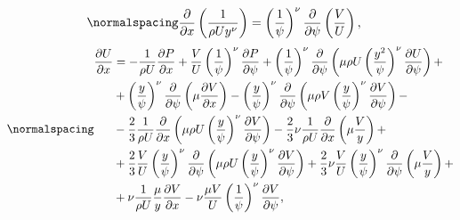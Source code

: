 \begin{equation}
\label{eq1:navie_parabol1}
\normalspacing
\begin{split}
&\frac{\partial}{\partial x}\left(\frac{1}{\rho U y^\nu}\right)=\left(\frac{1}{\psi}\right)^\nu \frac{\partial}{\partial \psi}\left(\frac{V}{U}\right),
\end{split}
\end{equation}
\begin{equation}
\label{eq1:navie_parabol2}
\normalspacing
\begin{split}
\frac{\partial U}{\partial x}&=-\frac{1}{\rho U} \frac{\partial P}{\partial x}+\frac{V}{U}\left(\frac{1}{\psi}\right)^\nu \frac{\partial P}{\partial \psi}+\left(\frac{1}{\psi}\right)^\nu \frac{\partial}{\partial \psi}\left(\mu \rho U\left(\frac{y^{2}}{\psi}\right)^\nu \frac{\partial U}{\partial \psi}\right)+\\
&+\left(\frac{y}{\psi}\right)^\nu \frac{\partial}{\partial \psi}\left(\mu \frac{\partial V}{\partial x}\right) -\left(\frac{y}{\psi}\right)^\nu \frac{\partial}{\partial \psi}\left(\mu \rho V\left(\frac{y}{\psi}\right)^\nu \frac{\partial V}{\partial \psi}\right)-\\
&-\frac{2}{3} \frac{1}{\rho U} \frac{\partial}{\partial x}\left(\mu \rho U\left(\frac{y}{\psi}\right)^\nu \frac{\partial V}{\partial \psi}\right) -\frac{2}{3} \nu \frac{1}{\rho U} \frac{\partial}{\partial x}\left(\mu \frac{V}{y}\right)+\\
&+\frac{2}{3} \frac{V}{U}\left(\frac{y}{\psi}\right)^\nu \frac{\partial}{\partial \psi}\left(\mu \rho U\left(\frac{y}{\psi}\right)^\nu \frac{\partial V}{\partial \psi}\right)+\frac{2}{3} \nu \frac{V}{U}\left(\frac{y}{\psi}\right)^\nu \frac{\partial}{\partial \psi}\left(\mu \frac{V}{y}\right) +\\
&+\nu \frac{1}{\rho U} \frac{\mu}{y} \frac{\partial V}{\partial x}-\nu \frac{\mu V}{U}\left(\frac{1}{\psi}\right)^\nu \frac{\partial V}{\partial \psi},
\end{split}
\end{equation}

